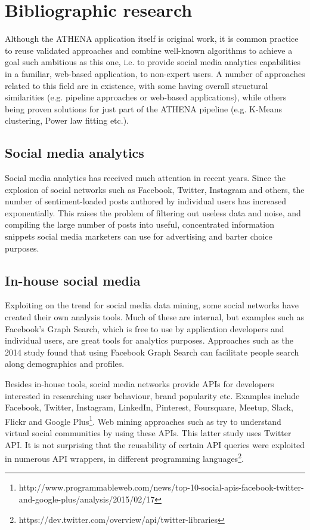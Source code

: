 \chapter{Bibliographic research}

Although the ATHENA application itself is original work, it is common practice to reuse validated approaches and combine well-known algorithms to achieve a goal such ambitious as this one, i.e. to provide social media analytics capabilities in a familiar, web-based application, to non-expert users. A number of approaches related to this field are in existence, with some having overall structural similarities (e.g. pipeline approaches or web-based applications), while others being proven solutions for just part of the ATHENA pipeline (e.g. K-Means clustering, Power law fitting etc.).

\section{Social media analytics}
Social media analytics has received much attention in recent years. Since the explosion of social networks such as Facebook, Twitter, Instagram and others, the number of sentiment-loaded posts authored by individual users has increased exponentially. This raises the problem of filtering out useless data and noise, and compiling the large number of posts into useful, concentrated information snippets social media marketers can use for advertising and barter choice purposes.

\section{In-house social media}
Exploiting on the trend for social media data mining, some social networks have created their own analysis tools. Much of these are internal, but examples such as Facebook's Graph Search, which is free to use by application developers and individual users, are great tools for analytics purposes. Approaches such as the 2014 study \cite{spirin2014people} found that using Facebook Graph Search can facilitate people search along demographics and profiles.

Besides in-house tools, social media networks provide APIs for developers interested in researching user behaviour, brand popularity etc. Examples include Facebook, Twitter, Instagram, LinkedIn, Pinterest, Foursquare, Meetup, Slack, Flickr and Google Plus\footnote{http://www.programmableweb.com/news/top-10-social-apis-facebook-twitter-and-google-plus/analysis/2015/02/17}. Web mining approaches such as \cite{java2007we} try to understand virtual social communities by using these APIs. This latter study uses Twitter API. It is not surprising that the reusability of certain API queries were exploited in numerous API wrappers, in different programming languages\footnote{https://dev.twitter.com/overview/api/twitter-libraries}.

